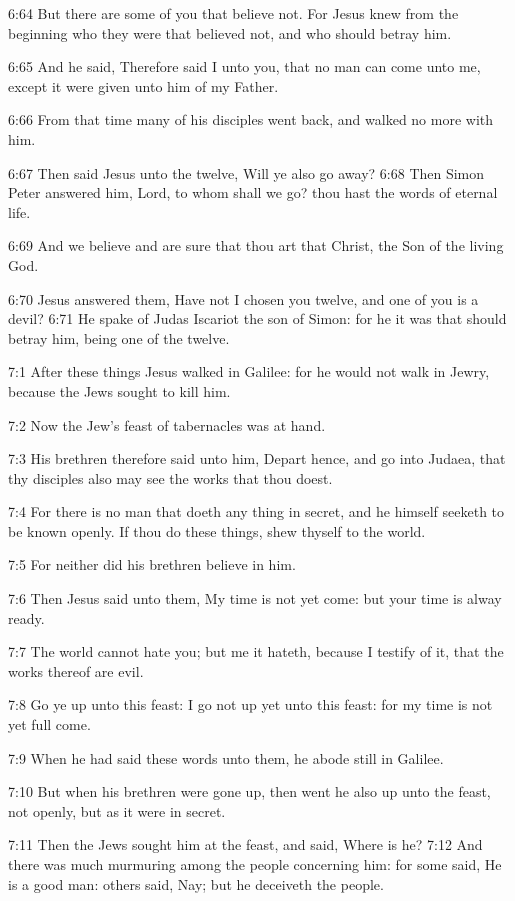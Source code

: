 6:64 But there are some of you that believe not. For Jesus knew from
the beginning who they were that believed not, and who should betray
him.

6:65 And he said, Therefore said I unto you, that no man can come unto
me, except it were given unto him of my Father.

6:66 From that time many of his disciples went back, and walked no
more with him.

6:67 Then said Jesus unto the twelve, Will ye also go away?  6:68 Then
Simon Peter answered him, Lord, to whom shall we go? thou hast the
words of eternal life.

6:69 And we believe and are sure that thou art that Christ, the Son of
the living God.

6:70 Jesus answered them, Have not I chosen you twelve, and one of you
is a devil?  6:71 He spake of Judas Iscariot the son of Simon: for he
it was that should betray him, being one of the twelve.

7:1 After these things Jesus walked in Galilee: for he would not walk
in Jewry, because the Jews sought to kill him.

7:2 Now the Jew's feast of tabernacles was at hand.

7:3 His brethren therefore said unto him, Depart hence, and go into
Judaea, that thy disciples also may see the works that thou doest.

7:4 For there is no man that doeth any thing in secret, and he himself
seeketh to be known openly. If thou do these things, shew thyself to
the world.

7:5 For neither did his brethren believe in him.

7:6 Then Jesus said unto them, My time is not yet come: but your time
is alway ready.

7:7 The world cannot hate you; but me it hateth, because I testify of
it, that the works thereof are evil.

7:8 Go ye up unto this feast: I go not up yet unto this feast: for my
time is not yet full come.

7:9 When he had said these words unto them, he abode still in Galilee.

7:10 But when his brethren were gone up, then went he also up unto the
feast, not openly, but as it were in secret.

7:11 Then the Jews sought him at the feast, and said, Where is he?
7:12 And there was much murmuring among the people concerning him: for
some said, He is a good man: others said, Nay; but he deceiveth the
people.


